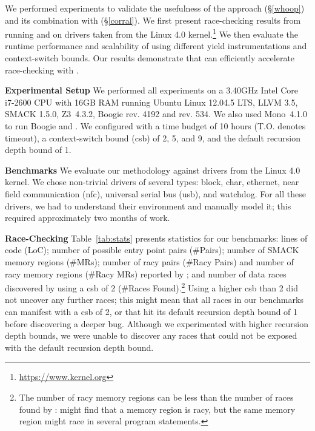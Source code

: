 We performed experiments to validate the usefulness of the \whoop approach (\S\ref{whoop}) and its combination with \corral (\S\ref{corral}). We first present race-checking results from running \whoop and \corral on \sizeOfBenchmarks drivers taken from the Linux 4.0 kernel.\footnote{\url{https://www.kernel.org}} We then evaluate the runtime performance and scalability of \corral using different yield instrumentations and context-switch bounds. Our results demonstrate that \whoop can efficiently accelerate race-checking with \corral.



\noindent\textbf{Experimental Setup }
%
We performed all experiments on a 3.40GHz Intel Core i7-2600 CPU with 16GB RAM running Ubuntu Linux 12.04.5 LTS, LLVM 3.5, SMACK 1.5.0, Z3~4.3.2, Boogie rev. 4192 and \corral rev. 534. We also used Mono~4.1.0 to run Boogie and \corral. We configured \corral with a time budget of 10 hours (T.O. denotes timeout), a context-switch bound (csb) of 2, 5, and 9, and the default recursion depth bound of 1.

\noindent\textbf{Benchmarks }
%
We evaluate our methodology against \sizeOfBenchmarks drivers from the Linux 4.0 kernel. We chose non-trivial drivers of several types: block, char, ethernet, near field communication (nfc), universal serial bus (usb), and watchdog. For all these drivers, we had to understand their environment and manually model it; this required approximately two months of work.

\noindent\textbf{Race-Checking }
%
Table~\ref{tab:stats} presents statistics for our benchmarks: lines of code (LoC); number of possible entry point pairs (\#Pairs); number of SMACK memory regions (\#MRs); number of racy pairs (\#Racy Pairs) and number of racy memory regions (\#Racy MRs) reported by \whoop; and number of data races discovered by \corral using a csb of 2 (\#Races Found).\footnote{The number of racy memory regions can be less than the number of races found by \corral: \whoop might find that a memory region is racy, but the same memory region might race in several program statements.} Using a higher csb than 2 did not uncover any further races; this might mean that all races in our benchmarks can manifest with a csb of 2, or that \corral hit its default recursion depth bound of 1 before discovering a deeper bug. Although we experimented with higher recursion depth bounds, we were unable to discover any races that could not be exposed with the default recursion depth bound.

